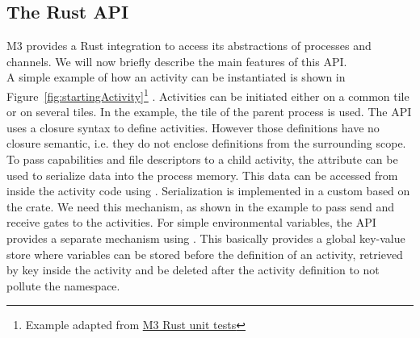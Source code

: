 \subsection{The Rust API}
M3 provides a Rust integration to access its abstractions of processes and channels. We will now briefly describe the main features of this API. \\

A simple example of how an activity can be instantiated is shown in Figure~\ref{fig:startingActivity}\footnote{Example adapted from \href{https://github.com/Barkhausen-Institut/M3/blob/master/src/apps/rustunittests/src/tactivity.rs}{M3 Rust unit tests}} . Activities can be initiated either on a common tile or on several tiles. In the example, the tile of the parent process is used. The API uses a closure syntax to define activities. However those definitions have no closure semantic, i.e. they do not enclose definitions from the surrounding scope.\\

To pass capabilities and file descriptors to a child activity, the attribute  can be used to serialize data into the process memory. This data can be accessed from inside the activity code using . Serialization is implemented in a custom  based on the  crate. We need this mechanism, as shown in the example to pass send and receive gates to the activities. For simple environmental variables, the API provides a separate mechanism using . This basically provides a global key-value store where variables can be stored before the definition of an activity, retrieved by key inside the activity and be deleted after the activity definition to not pollute the namespace.


